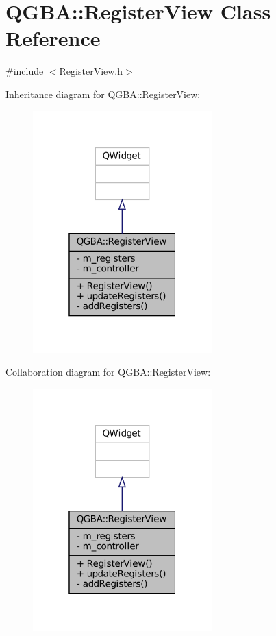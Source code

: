 \hypertarget{class_q_g_b_a_1_1_register_view}{}\section{Q\+G\+BA\+:\+:Register\+View Class Reference}
\label{class_q_g_b_a_1_1_register_view}


{\ttfamily \#include $<$Register\+View.\+h$>$}



Inheritance diagram for Q\+G\+BA\+:\+:Register\+View\+:
\nopagebreak
\begin{figure}[H]
\begin{center}
\leavevmode
\includegraphics[width=196pt]{class_q_g_b_a_1_1_register_view__inherit__graph}
\end{center}
\end{figure}


Collaboration diagram for Q\+G\+BA\+:\+:Register\+View\+:
\nopagebreak
\begin{figure}[H]
\begin{center}
\leavevmode
\includegraphics[width=196pt]{class_q_g_b_a_1_1_register_view__coll__graph}
\end{center}
\end{figure}
